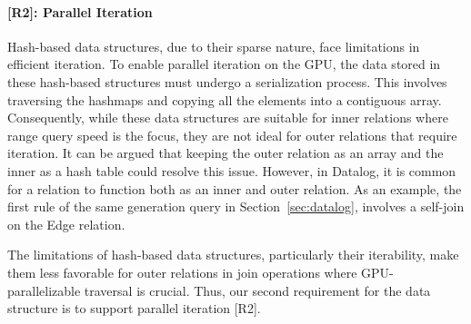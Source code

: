 \documentclass[nonacm,sigplan]{acmart}
\begin{document}
\paragraph*{[R2]: Parallel Iteration} Hash-based data structures, due to their sparse nature, face limitations in efficient iteration. To enable parallel iteration on the GPU, the data stored in these hash-based structures must undergo a serialization process. This involves traversing the hashmaps and copying all the elements into a contiguous array. Consequently, while these data structures are suitable for inner relations where range query speed is the focus, they are not ideal for outer relations that require iteration. It can be argued that keeping the outer relation as an array and the inner as a hash table could resolve this issue. However, in Datalog, it is common for a relation to function both as an inner and outer relation. 
As an example, the first rule of the same generation query in Section~\ref{sec:datalog}, involves a self-join on the Edge relation.



The limitations of hash-based data structures, particularly their iterability, make them less favorable for outer relations in join operations where GPU-parallelizable traversal is crucial. Thus, our second requirement for the data structure is to support parallel iteration [R2].




\end{document}
